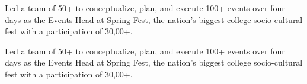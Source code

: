 \documentclass[a4paper,12pt]{memoir} %
\begin{document}
\Sep


{\bluebullet Led a team of 50+ to conceptualize, plan, and execute 100+ events over four days as the Events
Head at Spring Fest, the nation's biggest college socio-cultural fest with a participation of 30,00+.}

{\bluebullet Led a team of 50+ to conceptualize, plan, and execute 100+ events over four days as the Events
Head at Spring Fest, the nation's biggest college socio-cultural fest with a participation of 30,00+.}

\Sep
\end{document}
